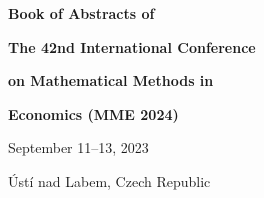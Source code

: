 \thispagestyle{empty}

\begin{center}
	
	{\huge \textbf{Book of Abstracts of}}
	
	
	{\Huge \textbf{The 42nd International Conference}}
	
	\bigskip
	
	{\Huge \textbf{on Mathematical Methods in}}
	
	\bigskip
	
	{\Huge \textbf{Economics (MME 2024)}}
	
	
	{\LARGE September 11--13, 2023}
	
	\medskip
	
	{\LARGE Ústí nad Labem, Czech Republic}
\end{center}

